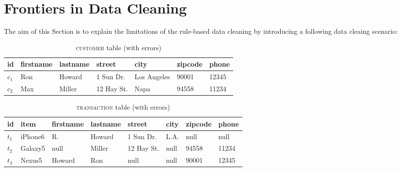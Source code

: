 \section{Frontiers in Data Cleaning}



The aim of this Section is to explain the limitations of the rule-based data cleaning by introducing a following data cleaing scenario:
\label{sec:example}
\begin{table}[h]\footnotesize
\scriptsize
\begin{tabular}{lllllll} \toprule 
\textbf{id} &  \textbf{firstname} & \textbf{lastname} & \textbf{street} & \textbf{city} & \textbf{zipcode} & \textbf{phone} \\ \midrule
$c_1$ & Ron & Howard & 1 Sun Dr. & Los Angeles & 90001 & 12345 \\
$c_2$ & Max & Miller & 12 Hay St. & Napa & 94558 & 11234 \\ \bottomrule
\end{tabular}
\vspace{-1em}
\caption{\textsc{customer} table (with errors)}
\label{tab:cust}
\end{table}

\begin{table}[h]\footnotesize
\scriptsize
\begin{tabular}{llllllll} \toprule 
\textbf{id} & \textbf{item} &  \textbf{firstname} & \textbf{lastname} & \textbf{street} & \textbf{city} & \textbf{zipcode} & \textbf{phone} \\ \midrule
$t_1$ & iPhone6 & R. & Howard & 1 Sun Dr. & L.A. & null & null \\
$t_2$ & Galaxy5 & null & Miller & 12 Hay St. & null & 94558 & 11234 \\
$t_3$ & Nexus5 & Howard & Ron & null & null & 90001 & 12345 \\ \bottomrule
\end{tabular}
\vspace{-1em}
\caption{\textsc{transaction} table (with errors)}
\label{tab:trans}
\end{table}


